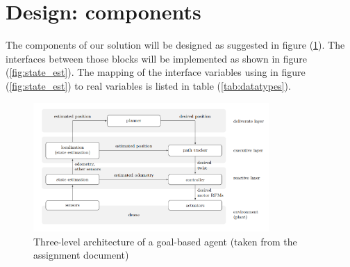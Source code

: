 \documentclass[a4paper,footsepline]{scrartcl}
\begin{document}
\section*{Design: components}
The components of our solution will be designed as suggested in figure (\ref{fig:layers}). The interfaces between those blocks will be implemented as shown in figure (\ref{fig:state_est}). The mapping of the interface variables using in figure (\ref{fig:state_est}) to real variables is listed in table (\ref{tab:datatypes}).
\begin{figure}
	\centering
	\includegraphics[width=0.8\textwidth]{images/figure.png}
	\caption{Three-level architecture of a goal-based agent (taken from the assignment document)}
	\label{fig:layers}
\end{figure}
\end{document}
